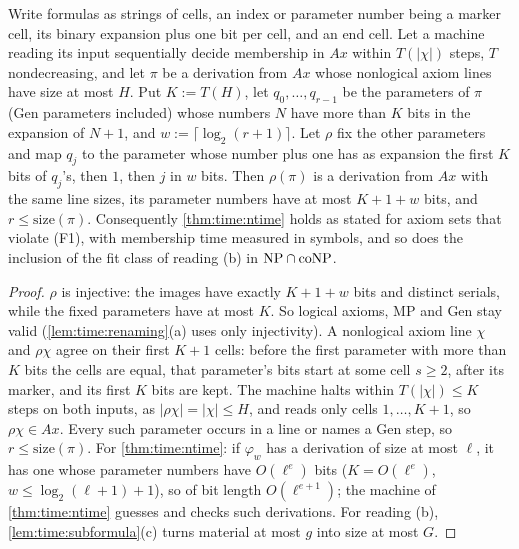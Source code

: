 \begin{lemma}\label{lem:time:truncate}
Write formulas as strings of cells, an index or parameter number being a marker cell, its binary expansion plus one bit per cell, and an end cell. Let a machine reading its input sequentially decide membership in $Ax$ within $T(|\chi|)$ steps, $T$ nondecreasing, and let $\pi$ be a derivation from $Ax$ whose nonlogical axiom lines have size at most $H$. Put $K:=T(H)$, let $q_0,\dots,q_{r-1}$ be the parameters of $\pi$ (Gen parameters included) whose numbers $N$ have more than $K$ bits in the expansion of $N+1$, and $w:=\lceil\log_2(r+1)\rceil$. Let $\rho$ fix the other parameters and map $q_j$ to the parameter whose number plus one has as expansion the first $K$ bits of $q_j$'s, then $1$, then $j$ in $w$ bits. Then $\rho(\pi)$ is a derivation from $Ax$ with the same line sizes, its parameter numbers have at most $K+1+w$ bits, and $r\le\mathrm{size}(\pi)$. Consequently \cref{thm:time:ntime} holds as stated for axiom sets that violate (F1), with membership time measured in symbols, and so does the inclusion of the fit class of reading (b) in $\mathrm{NP}\cap\mathrm{coNP}$.
\end{lemma}

\begin{proof}
$\rho$ is injective: the images have exactly $K+1+w$ bits and distinct serials, while the fixed parameters have at most $K$. So logical axioms, MP and Gen stay valid (\cref{lem:time:renaming}(a) uses only injectivity). A nonlogical axiom line $\chi$ and $\rho\chi$ agree on their first $K+1$ cells: before the first parameter with more than $K$ bits the cells are equal, that parameter's bits start at some cell $s\ge2$, after its marker, and its first $K$ bits are kept. The machine halts within $T(|\chi|)\le K$ steps on both inputs, as $|\rho\chi|=|\chi|\le H$, and reads only cells $1,\dots,K+1$, so $\rho\chi\in Ax$. Every such parameter occurs in a line or names a Gen step, so $r\le\mathrm{size}(\pi)$. For \cref{thm:time:ntime}: if $\varphi_w$ has a derivation of size at most $\ell$, it has one whose parameter numbers have $O(\ell^e)$ bits ($K=O(\ell^e)$, $w\le\log_2(\ell+1)+1$), so of bit length $O(\ell^{e+1})$; the machine of \cref{thm:time:ntime} guesses and checks such derivations. For reading (b), \cref{lem:time:subformula}(c) turns material at most $g$ into size at most $G$.
\end{proof}

